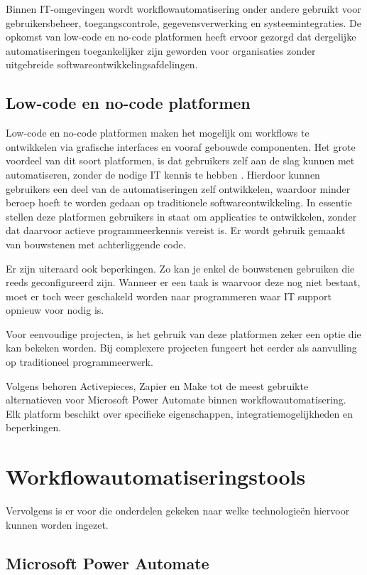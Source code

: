 Binnen IT-omgevingen wordt workflowautomatisering onder andere gebruikt voor gebruikersbeheer, toegangscontrole, gegevensverwerking en systeemintegraties. De opkomst van low-code en no-code platformen heeft ervoor gezorgd dat dergelijke automatiseringen toegankelijker zijn geworden voor organisaties zonder uitgebreide softwareontwikkelingsafdelingen.

\subsection{Low-code en no-code platformen}

Low-code en no-code platformen maken het mogelijk om workflows te ontwikkelen via grafische interfaces en vooraf gebouwde componenten. Het grote voordeel van dit soort platformen, is dat gebruikers zelf aan de slag kunnen met automatiseren, zonder de nodige IT kennis te hebben \autocite{Carlson2026}. Hierdoor kunnen gebruikers een deel van de automatiseringen zelf ontwikkelen, waardoor minder beroep hoeft te worden gedaan op traditionele softwareontwikkeling. In essentie stellen deze platformen gebruikers in staat om applicaties te ontwikkelen, zonder dat daarvoor actieve programmeerkennis vereist is. Er wordt gebruik gemaakt van bouwstenen met achterliggende code.

Er zijn uiteraard ook beperkingen. Zo kan je enkel de bouwstenen gebruiken die reeds geconfigureerd zijn. Wanneer er een taak is waarvoor deze nog niet bestaat, moet er toch weer geschakeld worden naar programmeren waar IT support opnieuw voor nodig is.

Voor eenvoudige projecten, is het gebruik van deze platformen zeker een optie die kan bekeken worden. Bij complexere projecten fungeert het eerder als aanvulling op traditioneel programmeerwerk.

Volgens \textcite{Nwibe2026} behoren Activepieces, Zapier en Make tot de meest gebruikte alternatieven voor Microsoft Power Automate binnen workflowautomatisering. Elk platform beschikt over specifieke eigenschappen, integratiemogelijkheden en beperkingen.

\section{Workflowautomatiseringstools}

Vervolgens is er voor die onderdelen gekeken naar welke technologieën hiervoor kunnen worden ingezet.

\subsection{Microsoft Power Automate}

